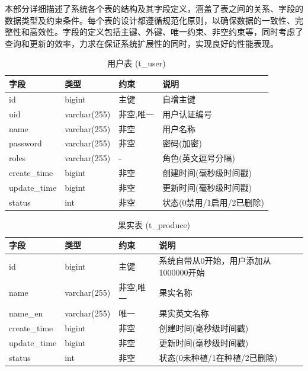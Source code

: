 本部分详细描述了系统各个表的结构及其字段定义，涵盖了表之间的关系、字段的数据类型及约束条件。每个表的设计都遵循规范化原则，以确保数据的一致性、完整性和高效性。字段的定义包括主键、外键、唯一约束、非空约束等，同时考虑了查询和更新的效率，力求在保证系统扩展性的同时，实现良好的性能表现。

\begin{table}[H]
    \centering
    \caption{用户表 (t\_user)}
    \begin{tabular}{|l|l|l|l|}
    \hline
    字段 & 类型 & 约束 & 说明 \\
    \hline
    id & bigint & 主键 & 自增主键 \\
    uid & varchar(255) & 非空,唯一 & 用户认证编号 \\
    name & varchar(255) & 非空 & 用户名称 \\
    password & varchar(255) & 非空 & 密码(加密) \\
    roles & varchar(255) & - & 角色(英文逗号分隔) \\
    create\_time & bigint & 非空 & 创建时间(毫秒级时间戳) \\
    update\_time & bigint & 非空 & 更新时间(毫秒级时间戳) \\
    status & int & 非空 & 状态(0禁用/1启用/2已删除) \\
    \hline
    \end{tabular}
    \end{table}

\begin{table}[H]
\centering
\caption{果实表 (t\_produce)}
\begin{tabular}{|l|l|l|l|}
\hline
字段 & 类型 & 约束 & 说明 \\
\hline
id & bigint & 主键 & 系统自带从0开始，用户添加从1000000开始 \\
name & varchar(255) & 非空,唯一 & 果实名称 \\
name\_en & varchar(255) & 唯一 & 果实英文名称 \\
create\_time & bigint & 非空 & 创建时间(毫秒级时间戳) \\
update\_time & bigint & 非空 & 更新时间(毫秒级时间戳) \\
status & int & 非空 & 状态(0未种植/1在种植/2已删除) \\
\hline
\end{tabular}
\end{table}

